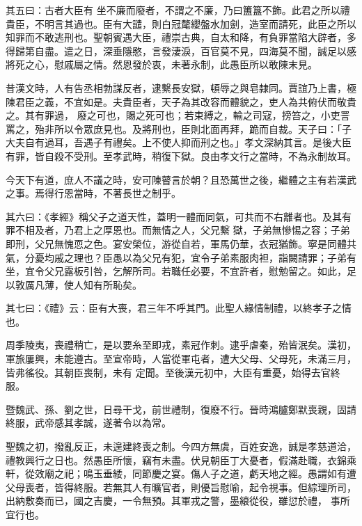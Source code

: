 \begin{pinyinscope}
 其五曰：古者大臣有
 坐不廉而廢者，不謂之不廉，乃曰簠簋不飾。此君之所以禮貴臣，不明言其過也。臣有大譴，則白冠氂纓盤水加劍，造室而請死，此臣之所以知罪而不敢逃刑也。聖朝賓遇大臣，禮崇古典，自太和降，有負罪當陷大辟者，多得歸第自盡。遣之日，深垂隱愍，言發淒淚，百官莫不見，四海莫不聞，誠足以感將死之心，慰戚屬之情。然恩發於衷，未著永制，此愚臣所以敢陳末見。



 昔漢文時，人有告丞相勃謀反者，逮繫長安獄，頓辱之與皂隸同。賈誼乃上書，極陳君臣之義，不宜如是。夫貴臣者，天子為其改容而體貌之，吏人為共俯伏而敬貴之。其有罪過，
 廢之可也，賜之死可也；若束縛之，輸之司寇，搒笞之，小吏詈罵之，殆非所以令眾庶見也。及將刑也，臣則北面再拜，跪而自裁。天子曰：「子大夫自有過耳，吾遇子有禮矣。上不使人抑而刑之也。」孝文深納其言。是後大臣有罪，皆自殺不受刑。至孝武時，稍復下獄。良由孝文行之當時，不為永制故耳。



 今天下有道，庶人不議之時，安可陳瞽言於朝？且恐萬世之後，繼體之主有若漢武之事。焉得行恩當時，不著長世之制乎。



 其六曰：《孝經》稱父子之道天性，蓋明一體而同氣，可共而不右離者也。及其有罪不相及者，乃君上之厚恩也。而無情之人，父兄繫
 獄，子弟無慘惕之容；子弟即刑，父兄無愧恧之色。宴安榮位，游從自若，軍馬仍華，衣冠猶飾。寧是同體共氣，分憂均戚之理也？臣愚以為父兄有犯，宜令子弟素服肉袒，詣闕請罪；子弟有坐，宜令父兄露板引咎，乞解所司。若職任必要，不宜許者，慰勉留之。如此，足以敦厲凡薄，使人知有所恥矣。



 其七曰：《禮》云：臣有大喪，君三年不呼其門。此聖人緣情制禮，以終孝子之情也。



 周季陵夷，喪禮稍亡，是以要糸至即戎，素冠作刺。逮乎虐秦，殆皆泯矣。漢初，軍旅屢興，未能遵古。至宣帝時，人當從軍屯者，遭大父母、父母死，未滿三月，皆弗徭役。其朝臣喪制，未有
 定聞。至後漢元初中，大臣有重憂，始得去官終服。



 暨魏武、孫、劉之世，日尋干戈，前世禮制，復廢不行。晉時鴻臚鄭默喪親，固請終服，武帝感其孝誠，遂著令以為常。



 聖魏之初，撥亂反正，未遑建終喪之制。今四方無虞，百姓安逸，誠是孝慈道洽，禮教興行之日也。然愚臣所懷，竊有未盡。伏見朝臣丁大憂者，假滿赴職，衣錦乘軒，從效廟之祀；鳴玉垂緌，同節慶之宴。傷人子之道，虧天地之經。愚謂如有遭父母喪者，皆得終服。若無其人有曠官者，則優旨慰喻，起令視事。但綜理所司，出納敷奏而已，國之吉慶，一令無預。其軍戎之警，墨縗從役，雖愆於禮，
 事所宜行也。




\end{pinyinscope}
